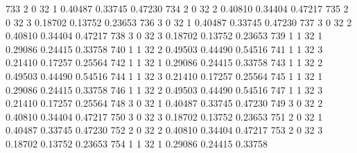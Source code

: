 \documentclass{article}
\begin{document}
\begin{Woutput}
 733      2       0      32       1       0.40487    0.33745    0.47230
 734      2       0      32       2       0.40810    0.34404    0.47217
 735      2       0      32       3       0.18702    0.13752    0.23653
 736      3       0      32       1       0.40487    0.33745    0.47230
 737      3       0      32       2       0.40810    0.34404    0.47217
 738      3       0      32       3       0.18702    0.13752    0.23653
 739      1       1      32       1       0.29086    0.24415    0.33758
 740      1       1      32       2       0.49503    0.44490    0.54516
 741      1       1      32       3       0.21410    0.17257    0.25564
 742      1       1      32       1       0.29086    0.24415    0.33758
 743      1       1      32       2       0.49503    0.44490    0.54516
 744      1       1      32       3       0.21410    0.17257    0.25564
 745      1       1      32       1       0.29086    0.24415    0.33758
 746      1       1      32       2       0.49503    0.44490    0.54516
 747      1       1      32       3       0.21410    0.17257    0.25564
 748      3       0      32       1       0.40487    0.33745    0.47230
 749      3       0      32       2       0.40810    0.34404    0.47217
 750      3       0      32       3       0.18702    0.13752    0.23653
 751      2       0      32       1       0.40487    0.33745    0.47230
 752      2       0      32       2       0.40810    0.34404    0.47217
 753      2       0      32       3       0.18702    0.13752    0.23653
 754      1       1      32       1       0.29086    0.24415    0.33758


\end{Woutput}
\end{document}
